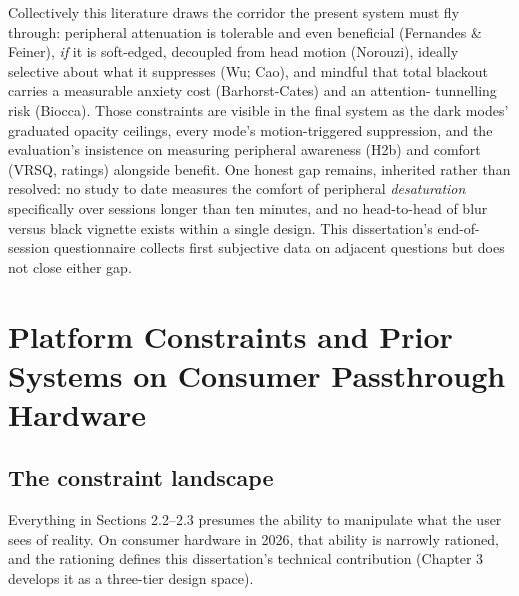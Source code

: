 Collectively this literature draws the corridor the present system must fly through: peripheral
attenuation is tolerable and even beneficial (Fernandes \& Feiner), \textit{if} it is soft-edged,
decoupled from head motion (Norouzi), ideally selective about what it suppresses (Wu; Cao), and
mindful that total blackout carries a measurable anxiety cost (Barhorst-Cates) and an attention-
tunnelling risk (Biocca). Those constraints are visible in the final system as the dark modes'
graduated opacity ceilings, every mode's motion-triggered suppression, and the evaluation's insistence
on measuring peripheral awareness (H2b) and comfort (VRSQ, ratings) alongside benefit. One honest
gap remains, inherited rather than resolved: no study to date measures the comfort of peripheral
\textit{desaturation} specifically over sessions longer than ten minutes, and no head-to-head of blur
versus black vignette exists within a single design. This dissertation's end-of-session questionnaire collects
first subjective data on adjacent questions but does not close either gap.

\section{Platform Constraints and Prior Systems on Consumer Passthrough Hardware}

\subsection{The constraint landscape}

Everything in Sections 2.2–2.3 presumes the ability to manipulate what the user sees of reality. On
consumer hardware in 2026, that ability is narrowly rationed, and the rationing defines this
dissertation's technical contribution (Chapter 3 develops it as a three-tier design space).

